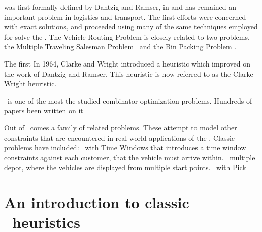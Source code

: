 \VRP was first formally defined by Dantzig and Ramser, in \cite{Dantzig:1959} and has remained an important problem in logistics and transport. The first efforts were concerned with exact solutions, and proceeded using many of the same techniques employed for solve the \TSP. The Vehicle Routing Problem is closely related to two problems, the Multiple Traveling Salesman Problem \MTSP\ and the Bin Packing Problem \BPP. 

The first 
In 1964, Clarke and Wright introduced a heuristic which improved on the work of Dantzig and Ramser. This heuristic is now referred to as the Clarke-Wright heuristic.



\VRP\ is one of the most the studied combinator optimization problems. Hundreds of papers been written on it  

Out of \VRP\ comes a family of related problems. These attempt to model other constraints that are encountered in real-world applications of the \VRP. Classic problems have included: \VRP\ with Time Windows that introduces a time window constraints  against each customer, that the vehicle must arrive within. \VRP\ multiple depot, where the vehicles are displayed from multiple start points. \VRP\ with Pick   

\subsection{\VRPTW}

\subsection{\PDPTW}


\section{An introduction to classic \VRP\ heuristics}

